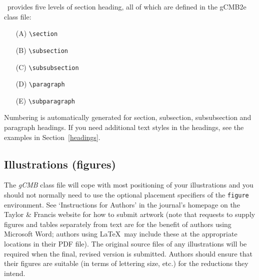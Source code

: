 \documentclass{gCMB2e}
\begin{document}
\LaTeXe\ provides five levels of section heading, all of which are defined in the gCMB2e class file:
\begin{enumerate}
   \item[(A)] \verb"\section"
   \item[(B)] \verb"\subsection"
   \item[(C)] \verb"\subsubsection"
   \item[(D)] \verb"\paragraph"
   \item[(E)] \verb"\subparagraph"
\end{enumerate}
Numbering is automatically generated for section, subsection, subsubsection and paragraph headings.  If you need
additional text styles in the headings, see the examples in Section~\ref{headings}.


\subsection{Illustrations (figures)}

The \textit{gCMB} class file will cope with most positioning of your illustrations and you should not normally need to use the optional placement specifiers of the \texttt{figure} environment. See
`Instructions for Authors' in the journal's homepage on the Taylor \& Francis website for how to submit artwork (note that requests to supply figures and tables separately from text are for the benefit of authors using Microsoft Word; authors using \LaTeX\ may include these at the appropriate locations in their PDF file). The original source files of any illustrations will be required when the final, revised version is submitted. Authors should ensure that their figures are suitable (in terms of lettering size, etc.) for the reductions they intend.
\end{document}
